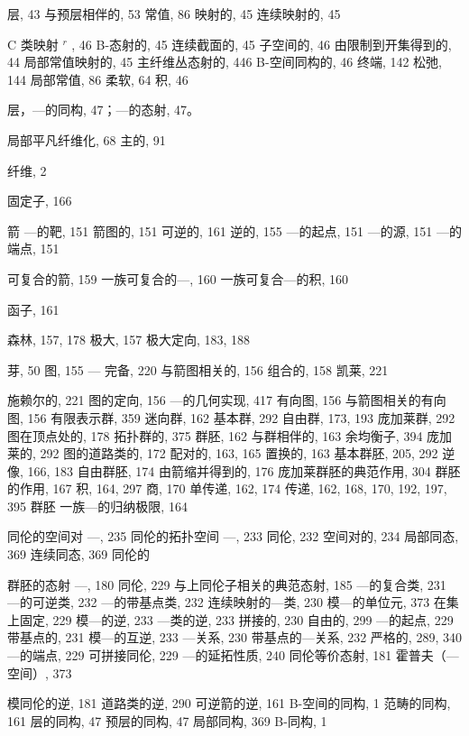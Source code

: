 
层, 43 与预层相伴的, 53 常值, 86 映射的, 45 连续映射的, 45

C 类映射 \(^{r}\) , 46 B-态射的, 45 连续截面的, 45 子空间的, 46 由限制到开集得到的, 44 局部常值映射的, 45 主纤维丛态射的, 446 B-空间同构的, 46 终端, 142 松弛, 144 局部常值, 86 柔软, 64 积, 46

层，---的同构, 47；---的态射, 47。

局部平凡纤维化, 68 主的, 91

纤维, 2

固定子, 166

箭 ---的靶, 151 箭图的, 151 可逆的, 161 逆的, 155 ---的起点, 151 ---的源, 151 ---的端点, 151

可复合的箭, 159 一族可复合的---, 160 一族可复合---的积, 160

函子, 161

森林, 157, 178 极大, 157 极大定向, 183, 188


芽, 50 图, 155 --- 完备, 220 与箭图相关的, 156 组合的, 158 凯莱, 221

施赖尔的, 221 图的定向, 156 ---的几何实现, 417 有向图, 156 与箭图相关的有向图, 156 有限表示群, 359 迷向群, 162 基本群, 292 自由群, 173, 193 庞加莱群, 292 图在顶点处的, 178 拓扑群的, 375 群胚, 162 与群相伴的, 163 余均衡子, 394 庞加莱的, 292 图的道路类的, 172 配对的, 163, 165 置换的, 163 基本群胚, 205, 292 逆像, 166, 183 自由群胚, 174 由箭缩并得到的, 176 庞加莱群胚的典范作用, 304 群胚的作用, 167 积, 164, 297 商, 170 单传递, 162, 174 传递, 162, 168, 170, 192, 197, 395 群胚 一族---的归纳极限, 164


同伦的空间对 ---, 235 同伦的拓扑空间 ---, 233 同伦, 232 空间对的, 234 局部同态, 369 连续同态, 369 同伦的

群胚的态射 ---, 180 同伦, 229 与上同伦子相关的典范态射, 185 ---的复合类, 231 ---的可逆类, 232 ---的带基点类, 232 连续映射的---类, 230 模---的单位元, 373 在集上固定, 229 模---的逆, 233 ---类的逆, 233 拼接的, 230 自由的, 299 ---的起点, 229 带基点的, 231 模---的互逆, 233 ---关系, 230 带基点的---关系, 232 严格的, 289, 340 ---的端点, 229 可拼接同伦, 229 ---的延拓性质, 240 同伦等价态射, 181 霍普夫（---空间）, 373


模同伦的逆, 181 道路类的逆, 290 可逆箭的逆, 161 B-空间的同构, 1 范畴的同构, 161 层的同构, 47 预层的同构, 47 局部同构, 369 B-同构, 1


